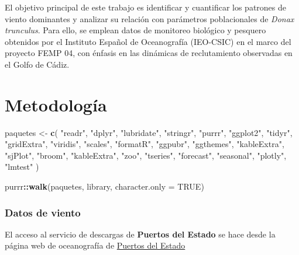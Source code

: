 \documentclass[
]{article}
\newenvironment{Shaded}{\begin{snugshade}}{\end{snugshade}}
\newcommand{\AttributeTok}[1]{\textcolor[rgb]{0.13,0.29,0.53}{#1}}
\newcommand{\ConstantTok}[1]{\textcolor[rgb]{0.56,0.35,0.01}{#1}}
\newcommand{\FunctionTok}[1]{\textcolor[rgb]{0.13,0.29,0.53}{\textbf{#1}}}
\newcommand{\NormalTok}[1]{#1}
\newcommand{\OtherTok}[1]{\textcolor[rgb]{0.56,0.35,0.01}{#1}}
\newcommand{\SpecialCharTok}[1]{\textcolor[rgb]{0.81,0.36,0.00}{\textbf{#1}}}
\newcommand{\StringTok}[1]{\textcolor[rgb]{0.31,0.60,0.02}{#1}}
\begin{document}
El objetivo principal de este trabajo es identificar y cuantificar los patrones de viento dominantes y analizar su relación con parámetros poblacionales de \emph{Donax trunculus}. Para ello, se emplean datos de monitoreo biológico y pesquero obtenidos por el Instituto Español de Oceanografía (IEO-CSIC) en el marco del proyecto FEMP 04, con énfasis en las dinámicas de reclutamiento observadas en el Golfo de Cádiz.

\newpage

\section{Metodología}\label{metodologuxeda}

\begin{Shaded}
\begin{Highlighting}[]
\NormalTok{paquetes }\OtherTok{\textless{}{-}} \FunctionTok{c}\NormalTok{(}
  \StringTok{"readr"}\NormalTok{, }\StringTok{"dplyr"}\NormalTok{, }\StringTok{"lubridate"}\NormalTok{, }\StringTok{"stringr"}\NormalTok{, }\StringTok{"purrr"}\NormalTok{,}
  \StringTok{"ggplot2"}\NormalTok{, }\StringTok{"tidyr"}\NormalTok{, }\StringTok{"gridExtra"}\NormalTok{, }\StringTok{"viridis"}\NormalTok{, }\StringTok{"scales"}\NormalTok{,}
  \StringTok{"formatR"}\NormalTok{, }\StringTok{"ggpubr"}\NormalTok{, }\StringTok{"ggthemes"}\NormalTok{, }\StringTok{"kableExtra"}\NormalTok{, }\StringTok{"sjPlot"}\NormalTok{, }
  \StringTok{"broom"}\NormalTok{, }\StringTok{"kableExtra"}\NormalTok{, }\StringTok{"zoo"}\NormalTok{, }\StringTok{"tseries"}\NormalTok{, }\StringTok{"forecast"}\NormalTok{,}
  \StringTok{"seasonal"}\NormalTok{, }\StringTok{"plotly"}\NormalTok{, }\StringTok{"lmtest"}
\NormalTok{  )}

\NormalTok{purrr}\SpecialCharTok{::}\FunctionTok{walk}\NormalTok{(paquetes, library, }\AttributeTok{character.only =} \ConstantTok{TRUE}\NormalTok{)}
\end{Highlighting}
\end{Shaded}

\subsubsection{Datos de viento}\label{datos-de-viento}

El acceso al servicio de descargas de \textbf{Puertos del Estado} se hace desde la página web de oceanografía de \href{http://www.puertos.es/es-es/oceanografia/Paginas/portus.aspx}{Puertos del Estado}
\end{document}
